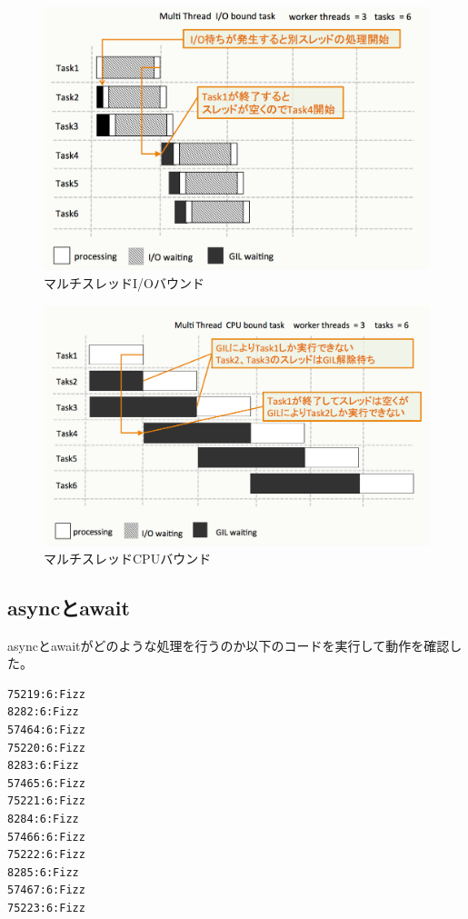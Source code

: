 \documentclass[14pt, oneside]{article}     	%
\begin{document}
\begin{figure}[H]
  \centering
  \includegraphics[width=12cm]{multithred_iobound.png}
  \caption{マルチスレッドI/Oバウンド}
  \label{multithred_iobound}
\end{figure}

\begin{figure}[H]
  \centering
  \includegraphics[width=12cm]{multithred_cpubound.png}
  \caption{マルチスレッドCPUバウンド}
  \label{multithred_cpubound}
\end{figure}


\subsection{asyncとawait}
asyncとawaitがどのような処理を行うのか以下のコードを実行して動作を確認した。


\begin{lstlisting}[caption=FizzBuzz実行結果]
75219:6:Fizz
8282:6:Fizz
57464:6:Fizz
75220:6:Fizz
8283:6:Fizz
57465:6:Fizz
75221:6:Fizz
8284:6:Fizz
57466:6:Fizz
75222:6:Fizz
8285:6:Fizz
57467:6:Fizz
75223:6:Fizz
\end{lstlisting}
\end{document}
